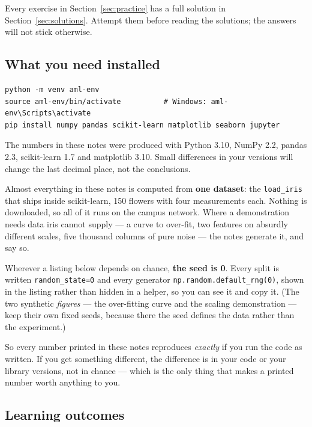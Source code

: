 \documentclass[11pt]{article}
\begin{document}
Every exercise in Section~\ref{sec:practice} has a full solution in
Section~\ref{sec:solutions}. Attempt them before reading the solutions; the
answers will not stick otherwise.

\subsection*{What you need installed}

\begin{lstlisting}
python -m venv aml-env
source aml-env/bin/activate          # Windows: aml-env\Scripts\activate
pip install numpy pandas scikit-learn matplotlib seaborn jupyter
\end{lstlisting}

The numbers in these notes were produced with Python 3.10, NumPy 2.2,
pandas 2.3, scikit-learn 1.7 and matplotlib 3.10. Small differences in your
versions will change the last decimal place, not the conclusions.

\begin{keyidea}
Almost everything in these notes is computed from \textbf{one dataset}: the
\texttt{load\_iris} that ships inside scikit-learn, 150 flowers with four
measurements each. Nothing is downloaded, so all of it runs on the campus
network. Where a demonstration needs data iris cannot supply --- a curve to
over-fit, two features on absurdly different scales, five thousand columns of
pure noise --- the notes generate it, and say so.

Wherever a listing below depends on chance, \textbf{the seed is 0}. Every split
is written \texttt{random\_state=0} and every generator
\texttt{np.random.default\_rng(0)}, shown in the listing rather than hidden in
a helper, so you can see it and copy it. (The two synthetic \emph{figures} ---
the over-fitting curve and the scaling demonstration --- keep their own fixed
seeds, because there the seed defines the data rather than the experiment.)

So every number printed in these notes reproduces \emph{exactly} if you run the
code as written. If you get something different, the difference is in your code
or your library versions, not in chance --- which is the only thing that makes a
printed number worth anything to you.
\end{keyidea}

\subsection*{Learning outcomes}
\end{document}

